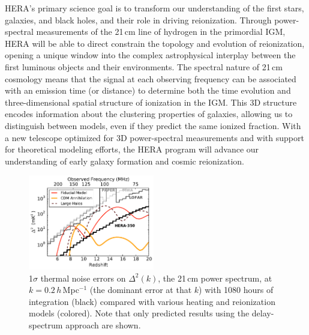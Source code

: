 \documentclass[preprint,11pt]{aastex}
\begin{document}
HERA's primary science goal is to transform our understanding of the first stars, galaxies, 
and black holes, and their role in driving reionization. 
Through power-spectral measurements of the 21\,cm line of hydrogen in the primordial IGM,
HERA will be able to direct constrain the topology and evolution of reionization, 
opening a unique window into the complex astrophysical interplay between the 
first luminous objects and their environments.
The spectral nature of 21\,cm cosmology means that 
the signal at each observing frequency can be associated with an emission time (or distance) to determine both the time evolution
and three-dimensional spatial structure of ionization in the IGM.
This 3D structure encodes information about the clustering properties of galaxies,
allowing us to distinguish between models, even if they predict the same ionized fraction. 
With a new telescope optimized for 3D power-spectral measurements and with support for theoretical
modeling efforts, the HERA program will advance our understanding of early galaxy formation and cosmic reionization.


\begin{figure}[h!]
\centering
    \includegraphics[width=0.49\textwidth,clip]{plots/sensitivity_wideband.pdf}
  \caption{ 1$\sigma$ thermal noise errors on $\Delta^2(k)$, the 21\,cm power spectrum, at $k\!=\!0.2$\,$h$\,Mpc$^{-1}$ (the dominant error at that $k$)
with 1080 hours of integration (black)
compared with various heating and reionization models (colored).  Note that only predicted results using the delay-spectrum approach are shown.}
	\label{fig:Sensitivities}
\end{figure}
\end{document}
